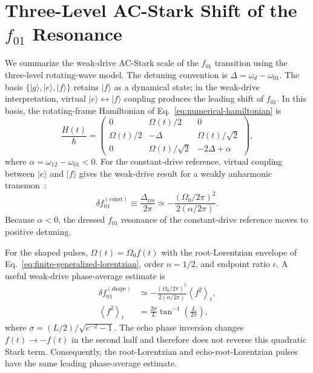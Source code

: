 \section{Three-Level AC-Stark Shift of the \texorpdfstring{$f_{01}$}{f01} Resonance}
\label{sec:ac-stark-shift}

We summarize the weak-drive AC-Stark scale of the $f_{01}$ transition
using the three-level rotating-wave model. The detuning convention is
$\Delta=\omega_d-\omega_{01}$. The basis
$\{|g\rangle,|e\rangle,|f\rangle\}$ retains $|f\rangle$ as a dynamical
state; in the weak-drive interpretation, virtual
$|e\rangle\leftrightarrow|f\rangle$ coupling produces the leading
shift of $f_{01}$. In this basis, the rotating-frame
Hamiltonian of Eq.~\eqref{eq:numerical-hamiltonian} is
\begin{equation}
    \frac{H(t)}{\hbar}=
    \begin{pmatrix}
        0 & \Omega(t)/2 & 0 \\
        \Omega(t)/2 & -\Delta & \Omega(t)/\sqrt{2} \\
        0 & \Omega(t)/\sqrt{2} & -2\Delta+\alpha
    \end{pmatrix},
    \label{eq:qutrit-ac-stark-hamiltonian}
\end{equation}
where $\alpha=\omega_{12}-\omega_{01}<0$.  For the constant-drive reference, virtual
coupling between $|e\rangle$ and $|f\rangle$ gives the weak-drive result
for a weakly anharmonic transmon~\cite{PhysRevA.76.042319,schneider_multilevel_2018}:
\begin{equation}
    \delta f_{01}^{(\mathrm{const})}
    \equiv \frac{\Delta_{\mathrm{res}}}{2\pi}
    \simeq
    -\frac{(\Omega_0/2\pi)^2}
    {2(\alpha/2\pi)}.
    \label{eq:qutrit-ac-stark-shift}
\end{equation}
Because $\alpha<0$, the dressed $f_{01}$ resonance of the constant-drive reference
moves to positive detuning.

For the shaped pulses, $\Omega(t)=\Omega_0 f(t)$ with the root-Lorentzian
envelope of Eq.~\eqref{eq:finite-generalized-lorentzian}, order $n=1/2$, and
endpoint ratio $c$. A useful weak-drive phase-average estimate is
\begin{equation}
    \begin{aligned}
    \delta f_{01}^{(\mathrm{shape})}
    &\simeq
    -\frac{(\Omega_0/2\pi)^2}{2(\alpha/2\pi)}
    \left\langle f^2\right\rangle_t,
    \\
    \left\langle f^2\right\rangle_t
    &=\frac{2\sigma}{L}\tan^{-1}\!\left(\frac{L}{2\sigma}\right),
    \end{aligned}
    \label{eq:shaped-ac-stark-average}
\end{equation}
where
$\sigma=(L/2)/\sqrt{c^{-2}-1}$. The echo phase inversion changes
$f(t)\rightarrow-f(t)$ in the second half and therefore does not reverse this
quadratic Stark term.  Consequently, the root-Lorentzian and
echo-root-Lorentzian pulses have the same leading phase-average estimate.

